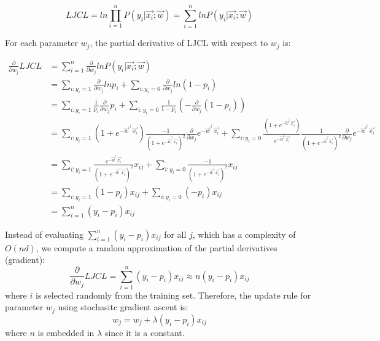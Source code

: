 \documentclass{article} %
\begin{document}
\begin{equation}
  LJCL = ln\prod\limits_{i=1}^nP(y_i | \vec{x_i}; \vec{w}) = \sum\limits_{i=1}^nlnP(y_i | \vec{x_i}; \vec{w})
\end{equation}

For each parameter $w_j$, the partial derivative of LJCL with respect to $w_j$ is:

\begin{equation}
\begin{split}
  \frac{\partial}{\partial w_j} LJCL &= \sum\limits_{i=1}^n\frac{\partial}{\partial w_j}lnP(y_i | \vec{x_i}; \vec{w})\\
  &= \sum\limits_{i:y_i=1}\frac{\partial}{\partial w_j}lnp_i + \sum\limits_{i:y_i=0}\frac{\partial}{\partial w_j}ln(1-p_i)\\
  &= \sum\limits_{i:y_i=1}\frac{1}{p_i}\frac{\partial}{\partial w_j}p_i + \sum\limits_{i:y_i=0}\frac{1}{1-p_i}(-\frac{\partial}{\partial w_j}(1-p_i))\\
  &= \sum\limits_{i:y_i=1}(1+e^{-\vec{w}^\top\vec{x_i}})\frac{-1}{(1+e^{-\vec{w}^\top\vec{x_i}})^2}\frac{\partial}{\partial w_j}e^{-\vec{w}^\top\vec{x_i}} + \sum\limits_{i:y_i=0}\frac{(1+e^{-\vec{w}^\top\vec{x_i}})}{e^{-\vec{w}^\top\vec{x_i}}}\frac{1}{(1+e^{-\vec{w}^\top\vec{x_i}})^2}\frac{\partial}{\partial w_j}e^{-\vec{w}^\top\vec{x_i}}\\
  &= \sum\limits_{i:y_i=1}\frac{e^{-\vec{w}^\top\vec{x_i}}}{(1+e^{-\vec{w}^\top\vec{x_i}})^2}x_{ij} + \sum\limits_{i:y_i=0}\frac{-1}{(1+e^{-\vec{w}^\top\vec{x_i}})^2}x_{ij}\\
  &= \sum\limits_{i:y_i=1}(1-p_i)x_{ij} + \sum\limits_{i:y_i=0}(-p_i)x_{ij}\\
  &= \sum\limits_{i=1}^n(y_i-p_i)x_{ij}
\end{split}
\end{equation}

Instead of evaluating $\sum\limits_{i=1}^n(y_i-p_i)x_{ij}$ for all $j$, which has a complexity of
$O(nd)$, we compute a random approximation of the partial derivatives (gradient):
\begin{equation}
  \frac{\partial}{\partial w_j} LJCL = \sum\limits_{i=1}^n(y_i-p_i)x_{ij} \approx n(y_i-p_i)x_{ij}
\end{equation}
where $i$ is selected randomly from the training set. Therefore, the update rule for parameter $w_j$ using stochasitc gradient ascent is:
\begin{equation}
  w_j = w_j + \lambda (y_i-p_i)x_{ij}
\end{equation}
where $n$ is embedded in $\lambda$ since it is a constant.
\end{document}

